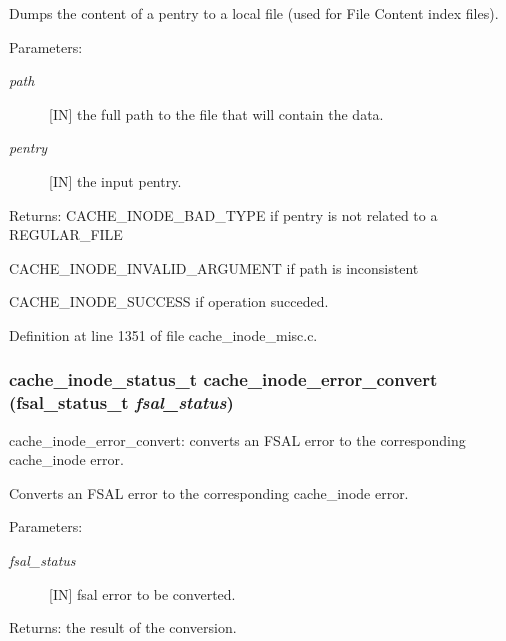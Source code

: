 Dumps the content of a pentry to a local file (used for File Content index files).

\begin{Desc}
\item[Parameters:]
\begin{description}
\item[{\em path}][IN] the full path to the file that will contain the data. \item[{\em pentry}][IN] the input pentry.\end{description}
\end{Desc}
\begin{Desc}
\item[Returns:]CACHE\_\-INODE\_\-BAD\_\-TYPE if pentry is not related to a REGULAR\_\-FILE \par
 

CACHE\_\-INODE\_\-INVALID\_\-ARGUMENT if path is inconsistent \par
 

CACHE\_\-INODE\_\-SUCCESS if operation succeded. \end{Desc}


Definition at line 1351 of file cache\_\-inode\_\-misc.c.
\subsubsection{\setlength{\rightskip}{0pt plus 5cm}cache\_\-inode\_\-status\_\-t cache\_\-inode\_\-error\_\-convert (fsal\_\-status\_\-t {\em fsal\_\-status})}\label{cache__inode__misc_8c_a5}


cache\_\-inode\_\-error\_\-convert: converts an FSAL error to the corresponding cache\_\-inode error.

Converts an FSAL error to the corresponding cache\_\-inode error.

\begin{Desc}
\item[Parameters:]
\begin{description}
\item[{\em fsal\_\-status}][IN] fsal error to be converted.\end{description}
\end{Desc}
\begin{Desc}
\item[Returns:]the result of the conversion. \end{Desc}


